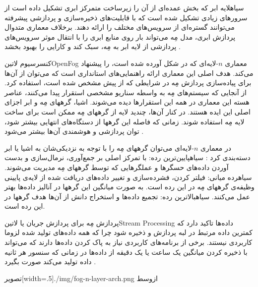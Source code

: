 ‌سیاه{لایه ابر} که بخش عمده‌ای از آن را زیرساخت متمرکز ابری تشکیل داده است از سرورهای زیادی تشکیل شده است که با قابلیت‌های ذخیره‌سازی و پردازشی
پیشرفته می‌توانند گستره‌ای از سرویس‌های مختلف را ارائه دهند. برخلاف معماری متدوال پردازش ابری، مدل مِه می‌تواند بار روی منابع ابری را با انتقال موثر سرویس‌های پردازشی
از لایه ابر به مِه، سبک کند و کارایی را بهبود بخشد
.

کنسرسیوم ‌لاتین{OpenFog} معماری $n$-لایه‌ای که در شکل  آورده شده است، را پیشنهاد می‌کند.
هدف اصلی این معماری ارائه راهنمایی‌های استانداری است که می‌توان از آن‌ها برای پیاده‌سازی پردازش مِه در شرایطی که از پیش مشخص شده است، استفاده کرد.
از آنجایی که سیستم‌های مِه به واسطه سناریو مشخصی استقرار پیدا می‌کنند، عناصر هسته این معماری در همه این استقرارها دیده می‌شوند.
اشیا، گرههای مِه و ابر اجزای اصلی این ایده هستند. در کنار آن‌ها، چندید لایه از گرههای مِه ممکن است برای ساخت لایه مِه استفاده شوند.
زمانی که فاصله این گرهها از دستگاه‌های انتهایی بیشتر شود، توان پردازشی و هوشمندی آن‌ها بیشتر می‌شود
.

در معماری $n$-لایه‌ای می‌توان گرههای مِه را با توجه به نزدیکی‌شان به اشیا یا ابر دسته‌بندی کرد
:
 ‌سیاه{پایین‌ترین رده}: با تمرکز اصلی بر جمع‌آوری، نرمال‌سازی و بدست آوردن داده‌های حسگرها و عملگرهایی که توسط گرههای مِه مدیریت می‌شوند.
 ‌سیاه{رده میانی}: فیلتر کردن، فشرده‌سازی و تغییر داده‌های دریافت شده از لایه‌ی پایینی وظیفه‌ی گرههای مِه در این رده است. به صورت میانگین
این گرهها در آنالیز داده‌ها بهتر عمل می‌کنند.
 ‌سیاه{بالاترین رده}: تجمیع داده‌ها و استخراج دانش از آن‌ها هدف گرهها در این رده است.

پردازش مِه برای پردازش جریان یا ‌لاتین{Stream Processing} داده‌ها تاکید دارد که کمترین داده مرتبط در لبه پردازش و ذخیره شود
چرا که همه داده‌های تولید شده لزوما کاربردی نیستند.
برخی از برنامه‌های کاربردی نیاز به پاک کردن داده‌ها دارند که می‌تواند با ذخیره کردن میانگین یک ساعت یا یک دقیقه از داده‌ها در زمانی که سنسور
هر ثانیه داده تولید می‌کند صورت بگیرد
.

‌تصویر[width=.5\textwidth]{./img/fog-n-layer-arch.png}
‌ازوسط

